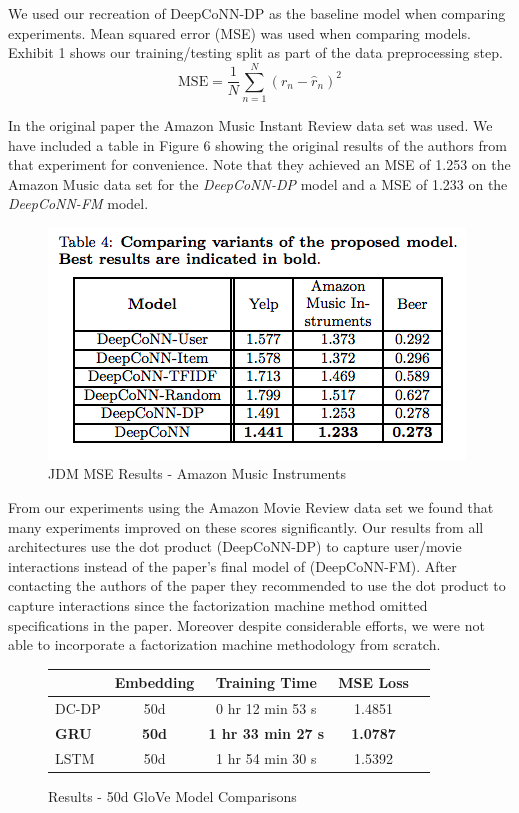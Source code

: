 \documentclass[10pt, twocolumn, letterpaper]{article}
\begin{document}
We used our recreation of DeepCoNN-DP as the baseline model when comparing experiments. Mean squared error (MSE) was used when comparing models. Exhibit 1 shows our training/testing split as part of the data preprocessing step.
$$
\mbox{MSE} = \frac{1}{N}\sum_{n=1}^{N}(r_{n} - \hat{r}_{n})^2
$$

In the original paper the Amazon Music Instant Review data set was used. We have included a table in Figure 6 showing the original results of the authors from that experiment for convenience. Note that they achieved an MSE of 1.253 on the Amazon Music data set for the \textit{DeepCoNN-DP} model and a MSE of 1.233 on the \textit{DeepCoNN-FM} model.

\begin{figure}[!ht]
\begin{center}
\includegraphics[scale=0.50]{orig_mses.png}
\caption{JDM MSE Results - Amazon Music Instruments}
\end{center}
\end{figure}

From our experiments using the Amazon Movie Review data set we found that many experiments improved on these scores significantly. Our results from all architectures use the dot product  (DeepCoNN-DP)  to capture user/movie interactions instead of the paper's final model of (DeepCoNN-FM). After contacting the authors of the paper they recommended to use the dot product to capture interactions since the factorization machine method omitted specifications in the paper. Moreover despite considerable efforts, we were not able to incorporate a factorization machine methodology from scratch.

\begin{figure}[!h]
\begin{center}
{\small
\begin{tabular}{l|cccc}
\hline
 & Embedding & Training Time & MSE Loss \\
\hline
DC-DP & 50d & 0 hr 12 min 53 s & 1.4851 \\
\textbf{GRU}& \textbf{50d}& \textbf{1 hr 33 min 27 s} & \textbf{1.0787} \\
LSTM & 50d & 1 hr 54 min 30 s & 1.5392 \\

\hline
\end{tabular}
}
\end{center}
\caption{Results - 50d GloVe Model Comparisons}
\end{figure}
\end{document}
